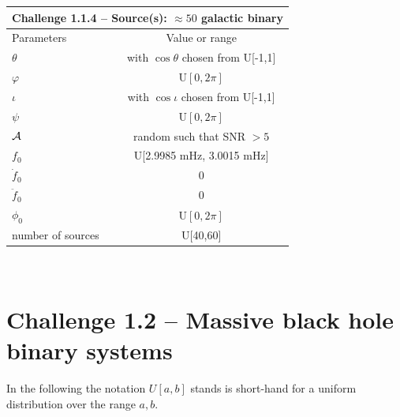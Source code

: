 \documentclass[11pt]{report}
\begin{document}
\begin{description}
\begin{center}
\begin{tabular}{l|c}
\hline \hline
\multicolumn{2}{c}{{\bf Challenge 1.1.4 -- Source(s): $\approx 50$ galactic binary}} \\
\hline
Parameters & Value or range \\
\hline
$\theta$          & with $\cos\theta$ chosen from U[-1,1]\\
$\varphi$         & U$[0,2\pi]$ \\ 
$\iota$           & with $\cos\iota$ chosen from U[-1,1]\\ 
$\psi$            & U$[0,2\pi]$ \\
${\cal A}$        & random such that SNR $> 5$  \\
$f_0$             & U[2.9985 mHz, 3.0015 mHz] \\ 
$\dot{f}_0$       & 0 \\ 
$\ddot{f}_0$      & 0\\ 
$\phi_0$          & U$[0,2\pi]$ \\
number of sources & U[40,60] \\
\hline \hline
\end{tabular} \\
\end{center}

\end{description}


\section{Challenge 1.2 -- Massive black hole binary systems}

In the following the notation $U[a,b]$ stands is short-hand for a uniform distribution over the range $a,b$. 
\end{document}
